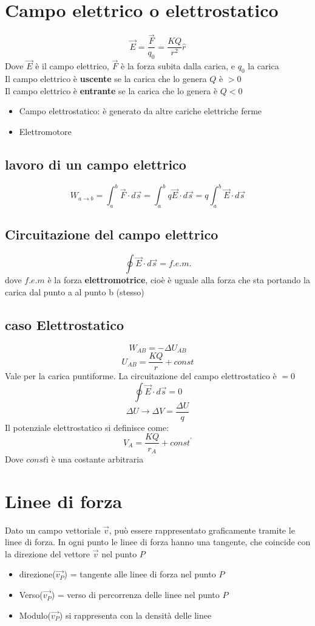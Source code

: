 \documentclass[a4paper]{report}
\begin{document}
  \section{Campo elettrico o elettrostatico}
  \[\vec{E} = \frac{\vec{F}}{q_0} = \frac{K Q}{r^2} \hat{r}\]
  Dove $\vec{E}$ è il campo elettrico, $\vec{F}$ è la forza subita dalla carica, e $q_0$ la carica\\
  Il campo elettrico è \textbf{uscente} se la carica che lo genera $Q$ è $>0$\\
  Il campo elettrico è \textbf{entrante} se la carica che lo genera è $Q<0$

  \begin{itemize}
    \item Campo elettrostatico: è generato da altre cariche elettriche ferme
    \item Elettromotore
  \end{itemize}

  \subsection{lavoro di un campo elettrico}
  \[ W_{a \rightarrow b} = \int_a^b \vec{F}\cdot d\vec{s} = \int_a^b q \vec{E} \cdot d\vec{s} = q \int_a^b \vec{E}\cdot d\vec{s} \]

  \subsection{Circuitazione del campo elettrico}
  \[\oint \vec{E} \cdot d\vec{s} = f.e.m.\]
  dove $f.e.m$ è la forza \textbf{elettromotrice}, cioè è uguale alla forza che sta portando la carica dal punto a al punto b (stesso)

  \subsection{caso Elettrostatico}
  \[ W_{AB} = - \Delta U_{AB}\]
  \[ U_{AB} = \frac{KQ}{r} + const \]
  Vale per la carica puntiforme. La circuitazione del campo elettrostatico è $=0$
  \[ \oint \vec{E} \cdot d\vec{s} = 0 \]
  \[ \Delta U \longrightarrow \Delta V = \frac{\Delta U}{q} \]
  Il potenziale elettrostatico si definisce come:
  \[ V_A = \frac{KQ}{r_A} + const^' \]
  Dove $constì$ è una costante arbitraria

  \section{Linee di forza}
  Dato un campo vettoriale $\vec{v}$, può essere rappresentato graficamente tramite le linee di forza. In ogni punto le linee di forza hanno una tangente, che coincide con la direzione del vettore $\vec{v}$ nel punto $P$
  \begin{itemize}
    \item direzione($\vec{v_P}$) = tangente alle linee di forza nel punto $P$
    \item Verso($\vec{v_P}$) = verso di percorrenza delle linee nel punto $P$
    \item Modulo($\vec{v_P}$) si rappresenta con la densità delle linee
  \end{itemize}
\end{document}

